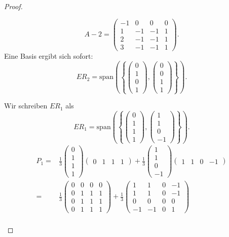 \begin{proof}
\begin{parts}
		\[
			A-2=\begin{pmatrix} -1 & 0 & 0 & 0 \\ 1 & -1 & -1 & 1 \\ 2 & -1 & -1 & 1 \\ 3 & -1 & -1 & 1 \end{pmatrix} 
		.\] 
		Eine Basis ergibt sich sofort:
		\[
			ER_2=\text{span}\left(\left\{ \begin{pmatrix} 0 \\ 1 \\ 0 \\ 1 \end{pmatrix} , \begin{pmatrix} 0 \\ 0 \\ 1 \\ 1 \end{pmatrix}  \right\}\right) 
		.\] 
	\item Wir schreiben $ER_1$ als
		\[
			ER_1=\text{span}\left( \left\{ \begin{pmatrix} 0 \\ 1 \\ 1 \\ 1 \end{pmatrix} , \begin{pmatrix} 1 \\ 1 \\ 0 \\ -1 \end{pmatrix}  \right\}  \right) 
		.\] 
		\begin{align*}
			P_1=&\frac{1}{3}\begin{pmatrix} 0 \\ 1 \\ 1 \\ 1 \end{pmatrix} \begin{pmatrix} 0 & 1 & 1 & 1 \end{pmatrix} +\frac{1}{3}\begin{pmatrix} 1 \\ 1 \\ 0 \\ -1 \end{pmatrix} \begin{pmatrix} 1 & 1 & 0 & -1 \end{pmatrix} \\
			=&\frac{1}{3}\begin{pmatrix} 0 & 0 & 0 & 0 \\ 0 & 1 & 1 & 1 \\ 0 & 1 & 1 & 1 \\ 0 & 1 & 1 & 1 \end{pmatrix} +\frac{1}{3}\begin{pmatrix} 1 & 1 & 0 & -1 \\ 1 & 1 & 0 & -1 \\ 0 & 0 & 0 & 0 \\ -1 & -1 & 0 & 1 \end{pmatrix}\\

\end{align*}
\end{parts}
\end{proof}
